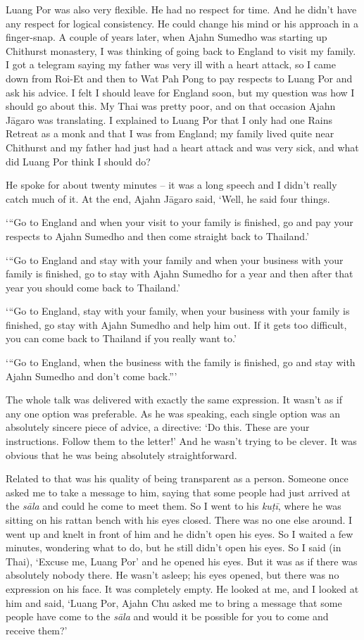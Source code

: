Luang Por was also very flexible. He had no respect for time. And he
didn't have any respect for logical consistency. He could change his
mind or his approach in a finger-snap. A couple of years later, when
Ajahn Sumedho was starting up Chithurst monastery, I was thinking of
going back to England to visit my family. I got a telegram saying my
father was very ill with a heart attack, so I came down from Roi-Et and
then to Wat Pah Pong to pay respects to Luang Por and ask his advice. I
felt I should leave for England soon, but my question was how I should
go about this. My Thai was pretty poor, and on that occasion Ajahn
Jāgaro was translating. I explained to Luang Por that I only had one
Rains Retreat as a monk and that I was from England; my family lived
quite near Chithurst and my father had just had a heart attack and was
very sick, and what did Luang Por think I should do?

He spoke for about twenty minutes -- it was a long speech and I didn't
really catch much of it. At the end, Ajahn Jāgaro said, `Well, he said
four things. 

`\thinspace ``Go to England and when your visit to your family is finished, go and
pay your respects to Ajahn Sumedho and then come straight back to
Thailand.'

`\thinspace ``Go to England and stay with your family and when your business with
your family is finished, go to stay with Ajahn Sumedho for a year and
then after that year you should come back to Thailand.'

`\thinspace ``Go to England, stay with your family, when your business with your
family is finished, go stay with Ajahn Sumedho and help him out. If it
gets too difficult, you can come back to Thailand if you really want
to.'

`\thinspace ``Go to England, when the business with the family is finished, go
and stay with Ajahn Sumedho and don't come back.''\thinspace '

The whole talk was delivered with exactly the same expression. It wasn't
as if any one option was preferable. As he was speaking, each single
option was an absolutely sincere piece of advice, a directive: `Do this. 
These are your instructions. Follow them to the letter!' And he wasn't
trying to be clever. It was obvious that he was being absolutely
straightforward.

Related to that was his quality of being transparent as a person. 
Someone once asked me to take a message to him, saying that some people
had just arrived at the \emph{sāla} and could he come to meet them. So I went
to his \emph{kuṭī}, where he was sitting on his rattan bench with his
eyes closed. There was no one else around. I went up and knelt in front
of him and he didn't open his eyes. So I waited a few minutes, wondering
what to do, but he still didn't open his eyes. So I said (in Thai), 
`Excuse me, Luang Por' and he opened his eyes. But it was as if there
was absolutely nobody there. He wasn't asleep; his eyes opened, but
there was no expression on his face. It was completely empty. He looked
at me, and I looked at him and said, `Luang Por, Ajahn Chu asked me to
bring a message that some people have come to the \emph{sāla} and would
it be possible for you to come and receive them?'

